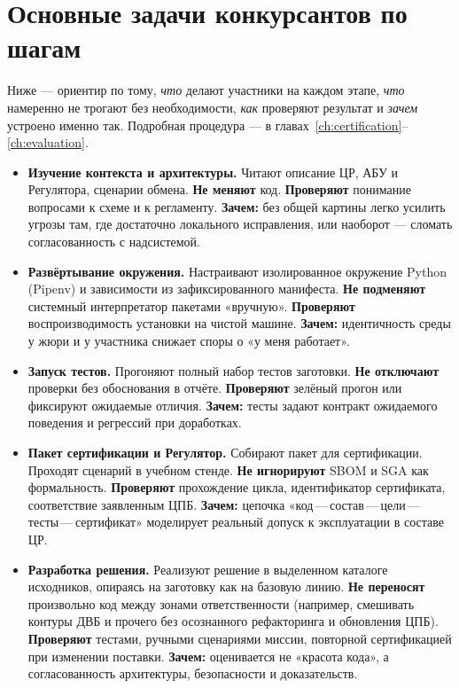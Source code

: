 \section{Основные задачи конкурсантов по шагам}
\label{sec:contestant-tasks}

Ниже --- ориентир по тому, \emph{что} делают участники на каждом этапе, \emph{что} намеренно не трогают без необходимости, \emph{как} проверяют результат и \emph{зачем} устроено именно так. Подробная процедура --- в главах~\ref{ch:certification}--\ref{ch:evaluation}.

\begin{itemize}
  \item \textbf{Изучение контекста и архитектуры.} Читают описание ЦР, АБУ и Регулятора, сценарии обмена. \textbf{Не меняют} код. \textbf{Проверяют} понимание вопросами к схеме и к регламенту. \textbf{Зачем:} без общей картины легко усилить угрозы там, где достаточно локального исправления, или наоборот --- сломать согласованность с надсистемой.

  \item \textbf{Развёртывание окружения.} Настраивают изолированное окружение Python (Pipenv) и зависимости из зафиксированного манифеста. \textbf{Не подменяют} системный интерпретатор пакетами «вручную». \textbf{Проверяют} воспроизводимость установки на чистой машине. \textbf{Зачем:} идентичность среды у жюри и у участника снижает споры о «у меня работает».

  \item \textbf{Запуск тестов.} Прогоняют полный набор тестов заготовки. \textbf{Не отключают} проверки без обоснования в отчёте. \textbf{Проверяют} зелёный прогон или фиксируют ожидаемые отличия. \textbf{Зачем:} тесты задают контракт ожидаемого поведения и регрессий при доработках.

  \item \textbf{Пакет сертификации и Регулятор.} Собирают пакет для сертификации. Проходят сценарий в учебном стенде. \textbf{Не игнорируют} SBOM и SGA как формальность. \textbf{Проверяют} прохождение цикла, идентификатор сертификата, соответствие заявленным ЦПБ. \textbf{Зачем:} цепочка «код\,---\,состав\,---\,цели\,---\,тесты\,---\,сертификат» моделирует реальный допуск к эксплуатации в составе ЦР.

  \item \textbf{Разработка решения.} Реализуют решение в выделенном каталоге исходников, опираясь на заготовку как на базовую линию. \textbf{Не переносят} произвольно код между зонами ответственности (например, смешивать контуры ДВБ и прочего без осознанного рефакторинга и обновления ЦПБ). \textbf{Проверяют} тестами, ручными сценариями миссии, повторной сертификацией при изменении поставки. \textbf{Зачем:} оценивается не «красота кода», а согласованность архитектуры, безопасности и доказательств.


\end{itemize}
